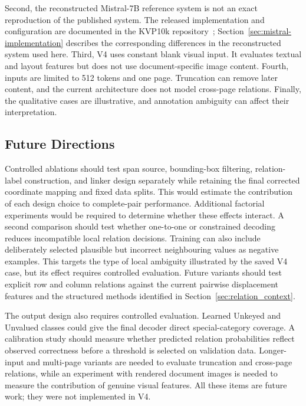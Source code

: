Second, the reconstructed Mistral-7B reference system is not an exact
reproduction of the published system. The released implementation and
configuration are documented in the KVP10k
repository~\cite{kvp10k_repository};
Section~\ref{sec:mistral-implementation} describes the corresponding
differences in the reconstructed system used here. Third, V4 uses constant
blank visual input. It evaluates textual and layout features but does not use
document-specific image content. Fourth, inputs are limited to 512 tokens and
one page. Truncation can remove later content, and the current architecture
does not model cross-page relations. Finally, the qualitative cases are
illustrative, and annotation ambiguity can affect their interpretation.

\subsection{Future Directions}

Controlled ablations should test span source, bounding-box filtering,
relation-label construction, and linker design separately while retaining the
final corrected coordinate mapping and fixed data splits. This would estimate
the contribution of each design choice to complete-pair performance.
Additional factorial experiments would be required to determine whether these
effects interact. A second comparison should test whether one-to-one or
constrained decoding reduces incompatible local relation decisions. Training
can also include deliberately selected plausible but incorrect neighbouring
values as negative examples. This targets the type of local ambiguity
illustrated by the saved V4 case, but its effect requires controlled
evaluation. Future variants should test explicit row and column relations
against the current pairwise displacement features and the structured methods
identified in Section~\ref{sec:relation_context}.

The output design also requires controlled evaluation. Learned Unkeyed and
Unvalued classes could give the final decoder direct special-category coverage.
A calibration study should measure whether predicted relation probabilities
reflect observed correctness before a threshold is selected on validation
data. Longer-input and multi-page variants are needed to evaluate truncation
and cross-page relations, while an experiment with rendered document images is
needed to measure the contribution of genuine visual features. All these items
are future work; they were not implemented in V4.
